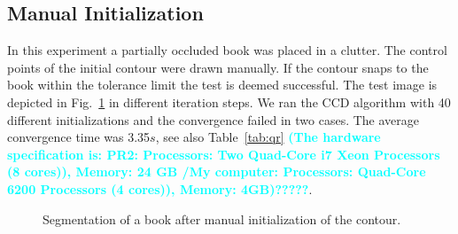 \documentclass[conference]{IEEEtran}
\newcommand{\review}[1]{\textbf{\textcolor{cyan}{#1}}}
\begin{document}
\subsection{Manual Initialization}
In this experiment  a partially occluded book was placed in a clutter. 
The control points of the initial contour were drawn manually. 
If the contour snaps to the book within the tolerance limit
the test is deemed successful. The test image is depicted in Fig.~\ref{fig:book}
in different iteration steps. We ran the CCD algorithm with 40 different initializations and the convergence
failed in two cases. The average convergence time was 3.35$s$, see
also Table~\ref{tab:qr} \review{(The hardware specification is: PR2:
  Processors: Two Quad-Core i7 Xeon Processors (8 cores)), Memory: 24
  GB /My computer: Processors: Quad-Core 6200 Processors (4 cores)), Memory: 4GB)?????}.
\begin{figure}[htbp]
  \begin{minipage}[t]{0.49\linewidth} 
    \centering 
  \end{minipage} 
  \begin{minipage}[t]{0.49\linewidth} 
    \centering 
  \end{minipage} 
  \begin{minipage}[t]{0.49\linewidth} 
    \centering 
  \end{minipage} 
  \begin{minipage}[t]{0.49\linewidth} 
    \centering 
  \end{minipage} 
  \caption{Segmentation of a book after manual initialization of the contour.}
  \label{fig:book}
\end{figure}
\end{document}

